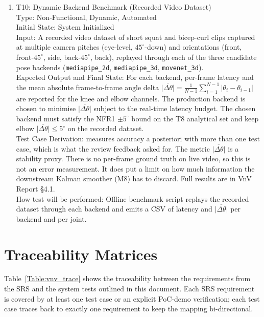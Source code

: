 \documentclass[12pt, titlepage]{article}
\begin{document}
\begin{enumerate}
\item{T10: Dynamic Backend Benchmark (Recorded Video Dataset)\\}
Type: Non-Functional, Dynamic, Automated\\
Initial State: System Initialized\\
Input: A recorded video dataset of short squat and bicep-curl clips
captured at multiple camera pitches (eye-level, $45^\circ$-down) and
orientations (front, front-$45^\circ$, side, back-$45^\circ$, back),
replayed through each of the three candidate pose backends
(\texttt{mediapipe\_2d}, \texttt{mediapipe\_3d}, \texttt{movenet\_3d}).\\
Expected Output and Final State: For each backend, per-frame latency and
the mean absolute frame-to-frame angle delta
$\overline{|\Delta\theta|} = \tfrac{1}{N{-}1}\sum_{i=1}^{N-1}
|\theta_i - \theta_{i-1}|$ are reported for the knee and elbow channels.
The production backend is chosen to minimise
$\overline{|\Delta\theta|}$ subject to the real-time latency budget. The
chosen backend must satisfy the NFR1 $\pm 5^\circ$ bound on the T8
analytical set and keep elbow $\overline{|\Delta\theta|} \le 5^\circ$
on the recorded dataset.\\
Test Case Derivation: measures accuracy a posteriori with more than
one test case, which is what the review feedback asked for. The
metric $\overline{|\Delta\theta|}$ is a stability proxy. There is no
per-frame ground truth on live video, so this is not an error
measurement. It does put a limit on how much information the downstream
Kalman smoother (M8) has to discard. Full results are in VnV
Report \S4.1.\\
How test will be performed: Offline benchmark script replays the
recorded dataset through each backend and emits a CSV of latency and
$\overline{|\Delta\theta|}$ per backend and per joint.
\end{enumerate}

\section{Traceability Matrices}\label{sec:trace}
Table~\ref{Table:vnv_trace} shows the traceability between the requirements from the SRS and the system tests outlined in this document. Each SRS requirement is covered by at least one test case or an explicit PoC-demo verification; each test case traces back to exactly one requirement to keep the mapping bi-directional.
\end{document}
